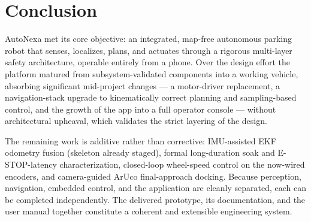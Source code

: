 \documentclass[12pt,a4paper]{report}
\newcommand{\pname}{AutoNexa}
\begin{document}
\chapter{Conclusion}

\pname{} met its core objective: an integrated, map-free autonomous parking robot
that senses, localizes, plans, and actuates through a rigorous multi-layer safety
architecture, operable entirely from a phone. Over the design effort the platform
matured from subsystem-validated components into a working vehicle, absorbing
significant mid-project changes --- a motor-driver replacement, a navigation-stack
upgrade to kinematically correct planning and sampling-based control, and the
growth of the app into a full operator console --- without architectural
upheaval, which validates the strict layering of the design.

The remaining work is additive rather than corrective: IMU-assisted EKF odometry
fusion (skeleton already staged), formal long-duration soak and E-STOP-latency
characterization, closed-loop wheel-speed control on the now-wired encoders, and
camera-guided ArUco final-approach docking. Because perception, navigation,
embedded control, and the application are cleanly separated, each can be completed
independently. The delivered prototype, its documentation, and the user manual
together constitute a coherent and extensible engineering system.
\end{document}
